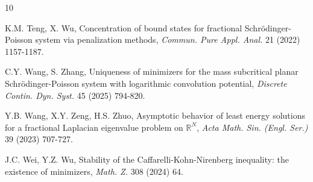 \documentclass[reqno, 11pt]{amsart} %
\numberwithin{equation}{section}
\begin{document}
\begin{thebibliography}{10}
		
		
		 K.M. Teng, X. Wu,
		Concentration of bound states for fractional Schr\"{o}dinger-Poisson system via penalization methods,
		{\em Commun. Pure Appl. Anal.} 21 (2022) 1157-1187.
		
		
		
		
		
		
		
		
		C.Y. Wang, S. Zhang,
		Uniqueness of minimizers for the mass subcritical planar Schr\"{o}dinger-Poisson system with logarithmic convolution potential,
		{\em Discrete Contin. Dyn. Syst.} 45 (2025) 794-820.
		
		Y.B. Wang, X.Y. Zeng, H.S. Zhuo,
		Asymptotic behavior of least energy solutions for a fractional Laplacian eigenvalue problem on  $\mathbb{R}^N$, {\em Acta Math. Sin. (Engl. Ser.)} 39 (2023) 707-727.
		
		J.C. Wei, Y.Z. Wu,
		Stability of the Caffarelli-Kohn-Nirenberg inequality: the existence of minimizers,
		{\em Math. Z.} 308 (2024) 64.
		
		
		
	\end{thebibliography}
\end{document}
